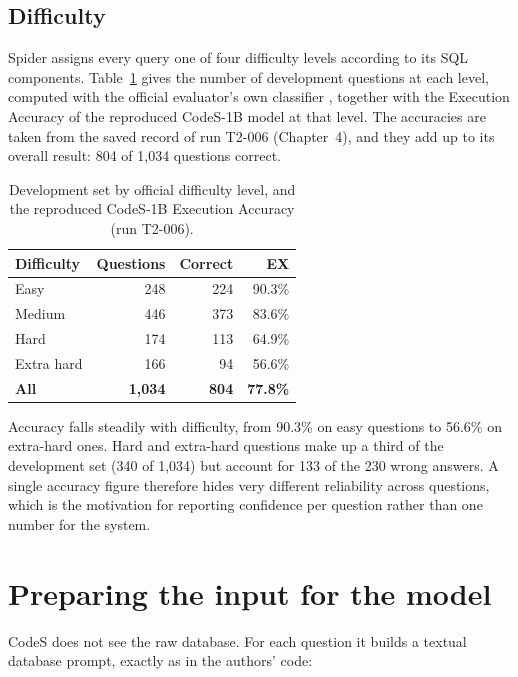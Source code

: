 \subsection{Difficulty}

Spider assigns every query one of four difficulty levels according to its SQL components. Table~\ref{tab:difficulty} gives the number of development questions at each level, computed with the official evaluator's own classifier \cite{zhong2020semantic}, together with the Execution Accuracy of the reproduced CodeS-1B model at that level. The accuracies are taken from the saved record of run T2-006 (Chapter~4), and they add up to its overall result: 804 of 1,034 questions correct.

\begin{table}[!t]
	\centering
	\caption{Development set by official difficulty level, and the reproduced CodeS-1B Execution Accuracy (run T2-006).}
	\label{tab:difficulty}
	\begin{tabular}{|l|r|r|r|}
		\hline
		\textbf{Difficulty} & \textbf{Questions} & \textbf{Correct} & \textbf{EX} \\ \hline
		Easy & 248 & 224 & 90.3\% \\ \hline
		Medium & 446 & 373 & 83.6\% \\ \hline
		Hard & 174 & 113 & 64.9\% \\ \hline
		Extra hard & 166 & 94 & 56.6\% \\ \hline
		\textbf{All} & \textbf{1,034} & \textbf{804} & \textbf{77.8\%} \\ \hline
	\end{tabular}
\end{table}

Accuracy falls steadily with difficulty, from 90.3\% on easy questions to 56.6\% on extra-hard ones. Hard and extra-hard questions make up a third of the development set (340 of 1,034) but account for 133 of the 230 wrong answers. A single accuracy figure therefore hides very different reliability across questions, which is the motivation for reporting confidence per question rather than one number for the system.

\section{Preparing the input for the model}

CodeS does not see the raw database. For each question it builds a textual database prompt, exactly as in the authors' code:

